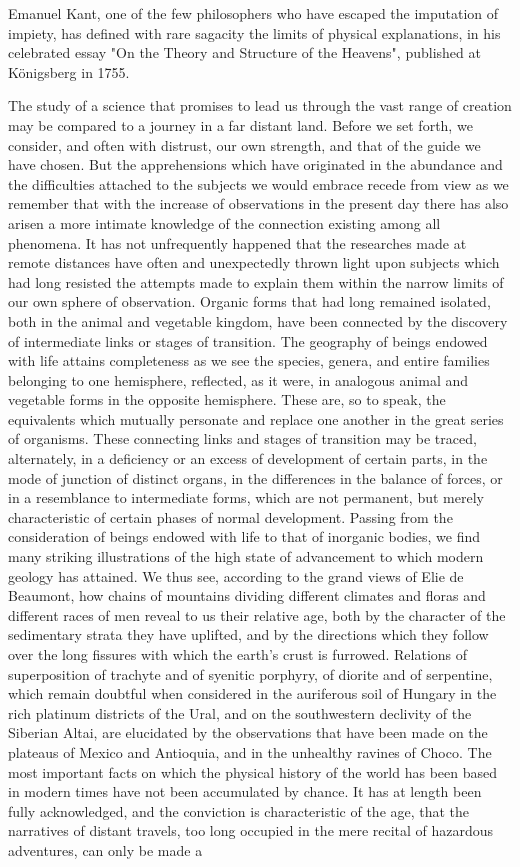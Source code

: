Emanuel Kant, one of the few philosophers who have escaped the imputation of impiety, has defined with rare sagacity the limits of physical explanations, in his celebrated essay "On the Theory and Structure of the Heavens", published at Königsberg in 1755.

The study of a science that promises to lead us through the vast range of creation may be compared to a journey in a far distant land. Before we set forth, we consider, and often with distrust, our own strength, and that of the guide we have chosen. But the apprehensions which have originated in the abundance and the difficulties attached to the subjects we would embrace recede from view as we remember that with the increase of observations in the present day there has also arisen a more intimate knowledge of the connection existing among all phenomena. It has not unfrequently happened that the researches made at remote distances have often and unexpectedly thrown light upon subjects which had long resisted the attempts made to explain them within the narrow limits of our own sphere of observation. Organic forms that had long remained isolated, both in the animal and vegetable kingdom, have been connected by the discovery of intermediate links or stages of transition. The geography of beings endowed with life attains completeness as we see the species, genera, and entire families belonging to one hemisphere, reflected, as it were, in analogous animal and vegetable forms in the opposite hemisphere. These are, so to speak, the equivalents which mutually personate and replace one another in the great series of organisms. These connecting links and stages of transition may be traced, alternately, in a deficiency or an excess of development of certain parts, in the mode of junction of distinct organs, in the differences in the balance of forces, or in a resemblance to intermediate forms, which are not permanent, but merely characteristic of certain phases of normal development. Passing from the consideration of beings endowed with life to that of inorganic bodies, we find many striking illustrations of the high state of advancement to which modern geology has attained. We thus see, according to the grand views of Elie de Beaumont, how chains of mountains dividing different climates and floras and different races of men reveal to us their relative age, both by the character of the sedimentary strata they have uplifted, and by the directions which they follow over the long fissures with which the earth's crust is furrowed. Relations of superposition of trachyte and of syenitic porphyry, of diorite and of serpentine, which remain doubtful when considered in the auriferous soil of Hungary in the rich platinum districts of the Ural, and on the southwestern declivity of the Siberian Altai, are elucidated by the observations that have been made on the plateaus of Mexico and Antioquia, and in the unhealthy ravines of Choco. The most important facts on which the physical history of the world has been based in modern times have not been accumulated by chance. It has at length been fully acknowledged, and the conviction is characteristic of the age, that the narratives of distant travels, too long occupied in the mere recital of hazardous adventures, can only be made a 